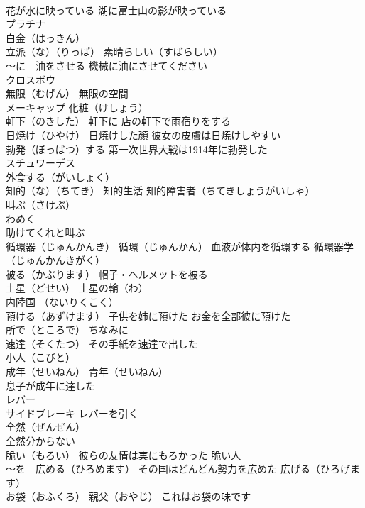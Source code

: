 \documentclass[8pt]{extreport}
\begin{document}
\begin{CJK}{UTF8}{min}
\\	花が水に映っている 湖に富士山の影が映っている
\\	プラチナ
\\	白金（はっきん）
\\	立派（な）（りっぱ） 素晴らしい（すばらしい）
\\	～に　油をさせる 機械に油にさせてください
\\	クロスボウ
\\	無限（むげん） 無限の空間
\\	メーキャップ 化粧（けしょう）
\\	軒下（のきした） 軒下に 店の軒下で雨宿りをする
\\	日焼け（ひやけ） 日焼けした顔 彼女の皮膚は日焼けしやすい
\\	勃発（ぼっぱつ）する 第一次世界大戦は1914年に勃発した
\\	スチュワーデス
\\	外食する（がいしょく）
\\	知的（な）（ちてき） 知的生活 知的障害者（ちてきしょうがいしゃ）
\\	叫ぶ（さけぶ）
\\	わめく 
\\	助けてくれと叫ぶ
\\	循環器（じゅんかんき） 循環（じゅんかん） 血液が体内を循環する 循環器学（じゅんかんきがく）
\\	被る（かぶります） 帽子・ヘルメットを被る
\\	土星（どせい） 土星の輪（わ）
\\	内陸国 （ないりくこく）
\\	預ける（あずけます） 子供を姉に預けた お金を全部彼に預けた
\\	所で（ところで） ちなみに
\\	速達（そくたつ） その手紙を速達で出した
\\	小人（こびと）
\\	成年（せいねん） 青年（せいねん）
\\	息子が成年に達した
\\	レバー 
\\	サイドブレーキ レバーを引く
\\	全然（ぜんぜん）
\\	全然分からない
\\	脆い（もろい） 彼らの友情は実にもろかった 脆い人
\\	～を　広める（ひろめます） その国はどんどん勢力を広めた 広げる（ひろげます）
\\	お袋（おふくろ） 親父（おやじ） これはお袋の味です

\end{CJK}
\end{document}
